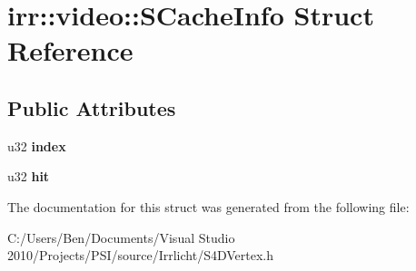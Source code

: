 \hypertarget{structirr_1_1video_1_1_s_cache_info}{\section{irr\-:\-:video\-:\-:S\-Cache\-Info Struct Reference}
\label{structirr_1_1video_1_1_s_cache_info}
}
\subsection*{Public Attributes}
\begin{DoxyCompactItemize}
\item 
\hypertarget{structirr_1_1video_1_1_s_cache_info_a09aec0ca6bde3abe7ea54fdb04b7738a}{u32 {\bfseries index}}\label{structirr_1_1video_1_1_s_cache_info_a09aec0ca6bde3abe7ea54fdb04b7738a}

\item 
\hypertarget{structirr_1_1video_1_1_s_cache_info_a688b053f55a26f507b2a541caad88c79}{u32 {\bfseries hit}}\label{structirr_1_1video_1_1_s_cache_info_a688b053f55a26f507b2a541caad88c79}

\end{DoxyCompactItemize}


The documentation for this struct was generated from the following file\-:\begin{DoxyCompactItemize}
\item 
C\-:/\-Users/\-Ben/\-Documents/\-Visual Studio 2010/\-Projects/\-P\-S\-I/source/\-Irrlicht/S4\-D\-Vertex.\-h\end{DoxyCompactItemize}
